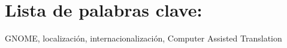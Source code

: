 %
%

\section*{Lista de palabras clave:}

GNOME, localización, internacionalización, Computer Assisted Translation

